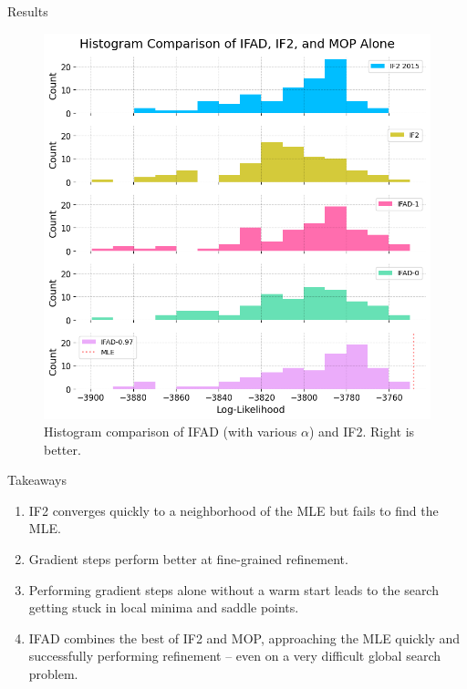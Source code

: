 \documentclass{beamer}
\begin{document}
\begin{frame}{Results}
    
\begin{figure}[u!]
    \centering
    \includegraphics[scale=0.35]{imgs/095/hist.png}
    \caption{Histogram comparison of IFAD (with various $\alpha$) and IF2. Right is better.}
    \label{fig:hist-all}
\end{figure}
\end{frame}

\begin{frame}{Takeaways}
    \begin{enumerate}
        \item IF2 converges quickly to a neighborhood of the MLE but fails to find the MLE.
        \item \pause Gradient steps perform better at fine-grained refinement.
        \item \pause Performing gradient steps alone without a warm start leads to the search getting stuck in local minima and saddle points.
        \item \pause IFAD combines the best of IF2 and MOP, approaching the MLE quickly and successfully performing refinement -- even on a very difficult global search problem.
    \end{enumerate}
\end{frame}
\end{document}
